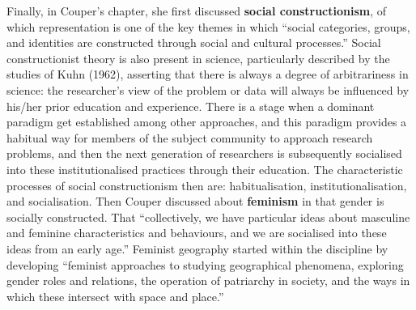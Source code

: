 \documentclass[a4paper, 10.5pt]{article} %
\begin{document}
Finally, in Couper's chapter, she first discussed \textbf{social constructionism}, of which representation is one of the key themes in which \enquote{social categories, groups, and identities are constructed through social and cultural processes.} Social constructionist theory is also present in science, particularly described by the studies of Kuhn (1962), asserting that there is always a degree of arbitrariness in science: the researcher's view of the problem or data will always be influenced by his/her prior education and experience. There is a stage when a dominant paradigm get established among other approaches, and this paradigm provides a habitual way for members of the subject community to approach research problems, and then the next generation of researchers is subsequently socialised into these institutionalised practices through their education. The characteristic processes of social constructionism then are: habitualisation, institutionalisation, and socialisation. Then Couper discussed about \textbf{feminism} in that gender is socially constructed. That \enquote{collectively, we have particular ideas about masculine and feminine characteristics and behaviours, and we are socialised into these ideas from an early age.} Feminist geography started within the discipline by developing \enquote{feminist approaches to studying geographical phenomena, exploring gender roles and relations, the operation of patriarchy in society, and the ways in which these intersect with space and place.}





\end{document}
